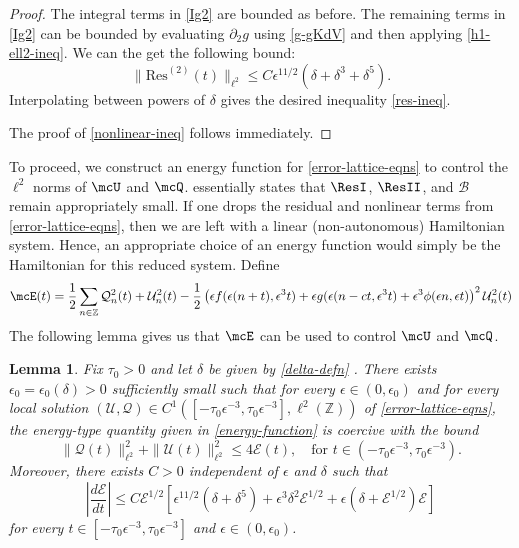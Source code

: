 \documentclass[oneside,reqno]{amsart}
\newtheorem{lem}{Lemma}[section]
\begin{document}
\begin{proof}
	The integral terms in \cref{Ig2} are bounded as before. The remaining terms in \cref{Ig2} can be bounded by evaluating \(\partial_2 g\) using \cref{g-gKdV} and then applying \cref{h1-ell2-ineq}. We can the get the following bound: \[\| \mathrm{Res}^{(2)}(t) \|_{\ell^2} \leq C \epsilon^{11/2} (\delta + \delta^3 + \delta^5).\] Interpolating between powers of \(\delta\) gives the desired inequality \cref{res-ineq}.
	
	The proof of \cref{nonlinear-ineq} follows immediately.
\end{proof}

To proceed, we construct an energy function for \cref{error-lattice-eqns} to control the \(\ell^2\) norms of \(\mcU\) and \(\mcQ\).  essentially states that \(\ResI\), \(\ResII\), and \(\mathcal B\) remain appropriately small. If one drops the residual and nonlinear terms from \cref{error-lattice-eqns}, then we are left with a linear (non-autonomous) Hamiltonian system. Hence, an appropriate choice of an energy function would simply be the Hamiltonian for this reduced system. Define 
\begin{equation}\label{energy-function}
	\mcE(t) = \frac 1 2 \sum_{n\in \mathbb Z} \mathcal Q_n^2(t) + \mathcal U_n^2(t) - \frac 1 2 \left(\epsilon f(\epsilon(n+t), \epsilon^3 t) + \epsilon g(\epsilon(n-ct, \epsilon^3t) + \epsilon^3 \phi(\epsilon n, \epsilon t)\right)^2 \mathcal U_n^2(t)
\end{equation}
The following lemma gives us that \(\mcE\) can be used to control \(\mcU\) and \(\mcQ\).
\begin{lem}\label{energy-coercive-bounds-lem}
	Fix \(\tau_0>0 \) and let \(\delta\) be given by \cref{delta-defn} . There exists \(\epsilon_0 = \epsilon_0(\delta) >0\) sufficiently small such that for every \(\epsilon \in (0,\epsilon_0)\) and for every local solution \((\mathcal U, \mathcal Q) \in C^1([-\tau_0\epsilon^{-3}, \tau_0\epsilon^{-3}], \ell^2(\mathbb Z))\) of \cref{error-lattice-eqns}, the energy-type quantity given in \cref{energy-function} is coercive with the bound
	\begin{equation}\label{coercive-bound}
		\|\mathcal Q(t) \|_{\ell^2}^2 + \| \mathcal U (t) \|_{\ell^2}^2 \leq  4 \mathcal E(t), \quad \text{for } t\in(-\tau_0\epsilon^{-3}, \tau_0\epsilon^{-3}).
	\end{equation}
	Moreover, there exists \(C> 0\) independent of \(\epsilon\) and \(\delta\) such that 
	\begin{equation*}
		\left|\frac{d\mathcal E}{dt} \right| \leq C \mathcal E^{1/2}\left[ \epsilon^{11/2} (\delta + \delta^5)  + \epsilon^3\delta^2\mathcal E^{1/2} + \epsilon(\delta + \mathcal{E}^{1/2})\mathcal E\right]
	\end{equation*}
	for every \(t\in [-\tau_0\epsilon^{-3}, \tau_0\epsilon^{-3}]\) and \(\epsilon \in (0,\epsilon_0)\). 	  
\end{lem}
\end{document}

